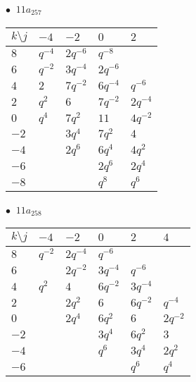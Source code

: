 \begin{minipage}{\linewidth}
$\bullet\ $ $11a_{257}$ \vspace{0.5em} \\
\begin{tabular}{l|llll}
$k \setminus j$ & $-4$ & $-2$ & $0$ & $2$ \\
\hline
$8$ & $q^{-4}$ & $2q^{-6}$ & $q^{-8}$ &  \\
$6$ & $q^{-2}$ & $3q^{-4}$ & $2q^{-6}$ &  \\
$4$ & $2$ & $7q^{-2}$ & $6q^{-4}$ & $q^{-6}$ \\
$2$ & $q^{2}$ & $6$ & $7q^{-2}$ & $2q^{-4}$ \\
$0$ & $q^{4}$ & $7q^{2}$ & $11$ & $4q^{-2}$ \\
$-2$ &  & $3q^{4}$ & $7q^{2}$ & $4$ \\
$-4$ &  & $2q^{6}$ & $6q^{4}$ & $4q^{2}$ \\
$-6$ &  &  & $2q^{6}$ & $2q^{4}$ \\
$-8$ &  &  & $q^{8}$ & $q^{6}$ \\
\end{tabular}
\vspace{2em}
\end{minipage}
%
\begin{minipage}{\linewidth}
$\bullet\ $ $11a_{258}$ \vspace{0.5em} \\
\begin{tabular}{l|lllll}
$k \setminus j$ & $-4$ & $-2$ & $0$ & $2$ & $4$ \\
\hline
$8$ & $q^{-2}$ & $2q^{-4}$ & $q^{-6}$ &  &  \\
$6$ &  & $2q^{-2}$ & $3q^{-4}$ & $q^{-6}$ &  \\
$4$ & $q^{2}$ & $4$ & $6q^{-2}$ & $3q^{-4}$ &  \\
$2$ &  & $2q^{2}$ & $6$ & $6q^{-2}$ & $q^{-4}$ \\
$0$ &  & $2q^{4}$ & $6q^{2}$ & $6$ & $2q^{-2}$ \\
$-2$ &  &  & $3q^{4}$ & $6q^{2}$ & $3$ \\
$-4$ &  &  & $q^{6}$ & $3q^{4}$ & $2q^{2}$ \\
$-6$ &  &  &  & $q^{6}$ & $q^{4}$ \\
\end{tabular}
\vspace{2em}
\end{minipage}
%
